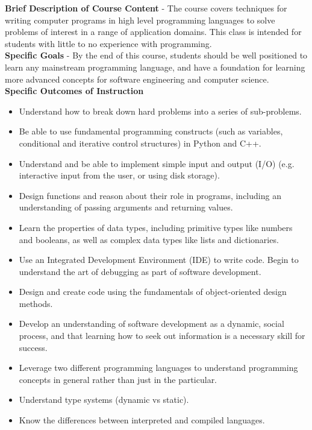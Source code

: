 \documentclass{article}
\begin{document}
\noindent \textbf{Brief Description of Course Content} - The course covers techniques for writing computer programs in high level programming languages to solve problems of interest in a range of application domains. This class is intended for students with little to no experience with programming. \\

\noindent \textbf{Specific Goals} - By the end of this course, students should be well positioned to learn any mainstream programming language, and have a foundation for learning more advanced concepts for software engineering and computer science. \\

\noindent \textbf{Specific Outcomes of Instruction}
\begin{itemize}
    \item Understand how to break down hard problems into a series of sub-problems.
    \item Be able to use fundamental programming constructs (such as variables, conditional and iterative control structures) in Python and C++.
    \item Understand and be able to implement simple input and output (I/O) (e.g. interactive input from the user, or using disk storage).
    \item Design functions and reason about their role in programs, including an understanding of passing arguments and returning values.
    \item Learn the properties of data types, including primitive types like numbers and booleans, as well as complex data types like lists and dictionaries.
    \item Use an Integrated Development Environment (IDE) to write code.  Begin to understand the art of debugging as part of software development.
    \item Design and create code using the fundamentals of object-oriented design methods.
    \item Develop an understanding of software development as a dynamic, social process, and that learning how to seek out information is a necessary skill for success.
    \item Leverage two different programming languages to understand programming concepts in general rather than just in the particular.
    \item Understand type systems (dynamic vs static).
    \item Know the differences between interpreted and compiled languages.
\end{itemize}
\end{document}
